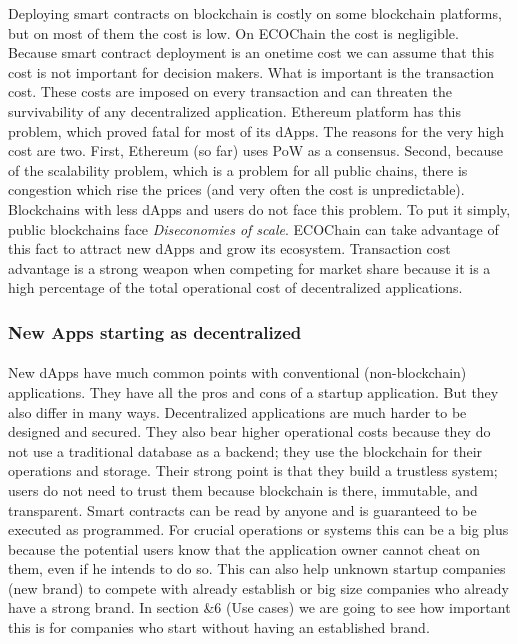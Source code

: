 \documentclass{article}
\begin{document}
\begin{itemize}
Deploying smart contracts on blockchain is costly on some blockchain platforms, but on most of them the cost is low. On ECOChain the cost is negligible. Because smart contract deployment is an onetime cost we can assume that this cost is not important for decision makers. What is important is the transaction cost. These costs are imposed on every transaction and can threaten the survivability of any decentralized application. Ethereum platform has this problem, which proved fatal for most of its dApps. The reasons for the very high cost are two. First, Ethereum (so far) uses PoW as a consensus. Second, because of the scalability problem, which is a problem for all public chains, there is congestion which rise the prices (and very often the cost is unpredictable). Blockchains with less dApps and users do not face this problem. To put it simply, public blockchains face \emph{Diseconomies of scale}. ECOChain can take advantage of this fact to attract new dApps and grow its ecosystem. Transaction cost advantage is a strong weapon when competing for market share because it is a high percentage of the total operational cost of decentralized applications.
\end{itemize}

\subsubsection{New Apps starting as decentralized}
\paragraph{}
New dApps have much common points with conventional (non-blockchain) applications. They have all the pros and cons of a startup application. But they also differ in many ways. Decentralized applications are much harder to be designed and secured. They also bear higher operational costs because they do not use a traditional database as a backend; they use the blockchain for their operations and storage. Their strong point is that they build a trustless system; users do not need to trust them because blockchain is there, immutable, and transparent. Smart contracts can be read by anyone and is guaranteed to be executed as programmed. For crucial operations or systems this can be a big plus because the potential users know that the application owner cannot cheat on them, even if he intends to do so. This can also help unknown startup companies (new brand) to compete with already establish or big size companies who already have a strong brand. In section \&6 (Use cases) we are going to see how important this is for companies who start without having an established brand.
\end{document}
